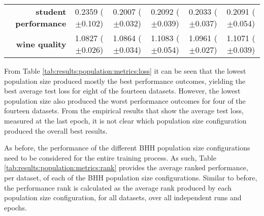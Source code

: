 \begin{table}[htb]
{\begin{tabular}{r|ccccc}
			\textbf{student performance} & \cellcolor[rgb]{ .973,  .412,  .42}0.2359 ($\pm$0.102)      & \cellcolor[rgb]{ .388,  .745,  .482}0.2007 ($\pm$0.032) & \cellcolor[rgb]{ 1,  .922,  .518}0.2092 ($\pm$0.039)    & \cellcolor[rgb]{ .573,  .796,  .49}0.2033 ($\pm$0.037) & \cellcolor[rgb]{ 1,  .922,  .518}0.2091 ($\pm$0.054)    \\
			\textbf{wine quality}        & \cellcolor[rgb]{ .388,  .745,  .482}1.0827 ($\pm$0.026)     & \cellcolor[rgb]{ .553,  .792,  .49}1.0864 ($\pm$0.034)  & \cellcolor[rgb]{ .973,  .412,  .42}1.1083 ($\pm$0.054)  & \cellcolor[rgb]{ 1,  .922,  .518}1.0961 ($\pm$0.027)   & \cellcolor[rgb]{ .976,  .463,  .431}1.1071 ($\pm$0.039) \\
		\end{tabular}%

	}
\end{table}%

From Table \ref{tab:results:population:metrics:loss} it can be seen that the lowest population size produced mostly the best performance outcomes, yielding the best average test loss for eight of the fourteen datasets. However, the lowest population size also produced the worst performance outcomes for four of the fourteen datasets. From the empirical results that show the average test loss, measured at the last epoch, it is not clear which population size configuration produced the overall best results.

As before, the performance of the different \acs{BHH} population size configurations need to be considered for the entire training process. As such, Table \ref{tab:results:population:metrics:rank} provides the average ranked performance, per dataset, of each of the \acs{BHH} population size configurations. Similar to before, the performance rank is calculated as the average rank produced by each population size configuration, for all datasets, over all independent runs and epochs.

